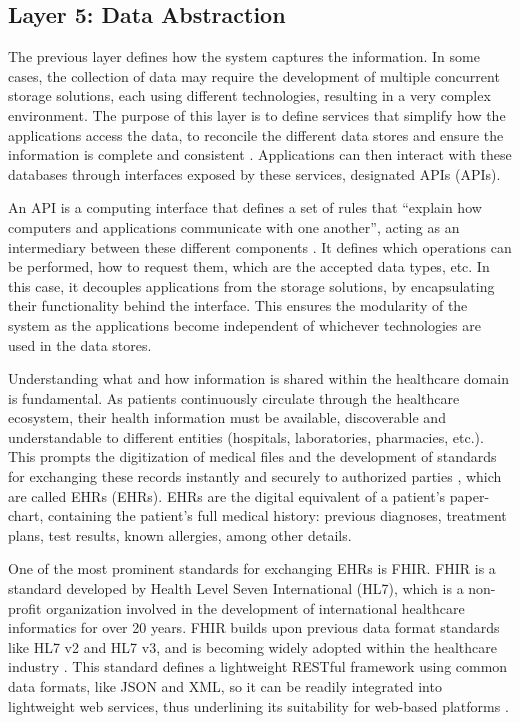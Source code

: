 \subsection{Layer 5: Data Abstraction}
\label{sec:iot-model-layer5}


The previous layer defines how the system captures the information. In some cases, the collection of data may require the development of multiple concurrent storage solutions, each using different technologies, resulting in a very complex environment. The purpose of this layer is to define services that simplify how the applications access the data, to reconcile the different data stores and ensure the information is complete and consistent \cite{Cisco2014}. Applications can then interact with these databases through interfaces exposed by these services, designated \acl{API}s (\acs{API}s). \bigskip 

An \acs{API} is a computing interface that defines a set of rules that ``explain how computers and applications communicate with one another'', acting as an intermediary between these different components \cite{IBMAPI}. It defines which operations can be performed, how to request them, which are the accepted data types, etc. In this case, it decouples applications from the storage solutions, by encapsulating their functionality behind the interface. This ensures the modularity of the system as the applications become independent of whichever technologies are used in the data stores. \bigskip

Understanding what and how information is shared within the healthcare domain is fundamental. As patients continuously circulate through the healthcare ecosystem, their health information must be available, discoverable and understandable to different entities (hospitals, laboratories, pharmacies, etc.). This prompts the digitization of medical files and the development of standards for exchanging these records instantly and securely to authorized parties \cite{HL72019}, which are called \acl{EHR}s (\acs{EHR}s). \acs{EHR}s are the digital equivalent of a patient's paper-chart, containing the patient's full medical history: previous diagnoses, treatment plans, test results, known allergies, among other details. \bigskip

One of the most prominent standards for exchanging \acs{EHR}s is \acf{FHIR}. \acs{FHIR} is a standard developed by Health Level Seven International (HL7), which is a non-profit organization involved in the development of international healthcare informatics for over 20 years. \acs{FHIR} builds upon previous data format standards like HL7 v2 and HL7 v3, and is becoming widely adopted within the healthcare industry \cite{Peng2019}. This standard defines a lightweight RESTful framework using common data formats, like JSON and XML, so it can be readily integrated into lightweight web services, thus underlining its suitability for web-based platforms \cite{Gruendner2019}.

